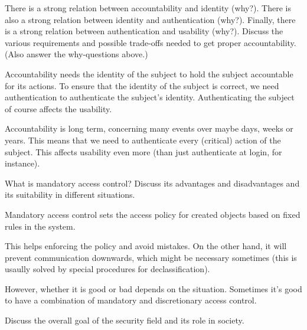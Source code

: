 \question[3]
There is a strong relation between accountability and identity (why?).
There is also a strong relation between identity and authentication (why?).
Finally, there is a strong relation between authentication and usability (why?).
Discuss the various requirements and possible trade-offs needed to get proper 
accountability.
(Also answer the why-questions above.)

\begin{solution}
Accountability needs the identity of the subject to hold the subject accountable 
for its actions.
To ensure that the identity of the subject is correct, we need authentication to 
authenticate the subject's identity.
Authenticating the subject of course affects the usability.

Accountability is long term, concerning many events over maybe days, weeks or 
years.
This means that we need to authenticate every (critical) action of the subject.
This affects usability even more (than just authenticate at login, for 
instance).
\end{solution}
\question[3]
What is mandatory access control?
Discuss its advantages and disadvantages and its suitability in different 
situations.

\begin{solution}
  Mandatory access control sets the access policy for created objects based on 
  fixed rules in the system.

  This helps enforcing the policy and avoid mistakes.
  On the other hand, it will prevent communication downwards, which might be 
  necessary sometimes (this is usaully solved by special procedures for 
  declassification).

  However, whether it is good or bad depends on the situation.
  Sometimes it's good to have a combination of mandatory and discretionary 
  access control.
\end{solution}


\question[3]

Discuss the overall goal of the security field and its role in society.

